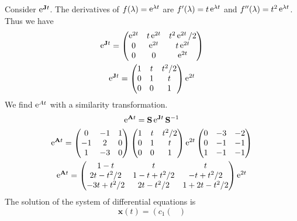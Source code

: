 \begin{Example}
  Consider $\mathop{\mathrm{e}}\nolimits^{\mathbf{J} t}$.  The derivatives of $f(\lambda) = \mathop{\mathrm{e}}\nolimits^{\lambda t}$ 
  are $f'(\lambda) = t \mathop{\mathrm{e}}\nolimits^{\lambda t}$ and $f''(\lambda) = t^2 \mathop{\mathrm{e}}\nolimits^{\lambda t}$.
  Thus we have
  \begin{gather*}
    \mathop{\mathrm{e}}\nolimits^{\mathbf{J} t} = 
    \begin{pmatrix}
      \mathop{\mathrm{e}}\nolimits^{2 t} & t \mathop{\mathrm{e}}\nolimits^{2 t} & t^2 \mathop{\mathrm{e}}\nolimits^{2 t} / 2 \\
      0 & \mathop{\mathrm{e}}\nolimits^{2 t} & t \mathop{\mathrm{e}}\nolimits^{2 t} \\
      0 & 0 & \mathop{\mathrm{e}}\nolimits^{2 t}
    \end{pmatrix} \\
    \mathop{\mathrm{e}}\nolimits^{\mathbf{J} t} = 
    \begin{pmatrix}
      1 & t & t^2 / 2 \\
      0 & 1 & t \\
      0 & 0 & 1
    \end{pmatrix} \mathop{\mathrm{e}}\nolimits^{2 t}
  \end{gather*}
  We find $\mathop{\mathrm{e}}\nolimits^{A t}$ with a similarity transformation.
  \begin{gather*}
    \mathop{\mathrm{e}}\nolimits^{\mathbf{A} t} = \mathbf{S} \mathop{\mathrm{e}}\nolimits^{\mathbf{J} t} \mathbf{S}^{-1} \\
    \mathop{\mathrm{e}}\nolimits^{\mathbf{A} t} =   \begin{pmatrix}
      0 & -1 & 1 \\
      -1 & 2 & 0 \\
      1 & -3 & 0 
    \end{pmatrix} 
    \begin{pmatrix}
      1 & t & t^2 / 2 \\
      0 & 1 & t \\
      0 & 0 & 1
    \end{pmatrix} \mathop{\mathrm{e}}\nolimits^{2 t}
    \begin{pmatrix}
      0 & -3 & -2 \\
      0 & -1 & -1 \\
      1 & -1 & -1 
    \end{pmatrix} \\
    \mathop{\mathrm{e}}\nolimits^{\mathbf{A} t} = 
    \begin{pmatrix}
      1-t & t & t \\
      2 t-t^2 / 2 & 1 - t + t^2 / 2 & -t + t^2 / 2 \\
      -3 t + t^2 / 2 & 2 t - t^2 / 2 & 1 + 2 t - t^2 / 2 
    \end{pmatrix}
    \mathop{\mathrm{e}}\nolimits^{2 t}
  \end{gather*}
  The solution of the system of differential equations is
  \[
  \boxed{
    \mathbf{x}(t) = 
    \left(
      c_1
      \begin{pmatrix}

\end{pmatrix}}\]
\end{Example}
